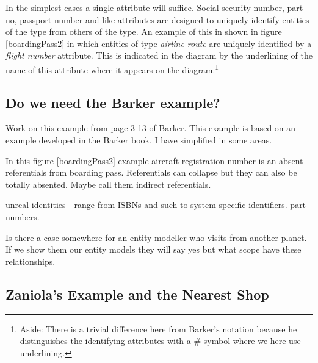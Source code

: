 \mynote In the simplest cases a single attribute will suffice. Social security number, part no, 
passport number and like attributes are designed to uniquely identify entities of the type from others of the type. 
An example of this 
in  shown in figure \ref{boardingPass2} in which entities of type \textit{airline route} are uniquely identified by a \textit{flight number} attribute.
This is
indicated in the diagram  by the underlining of the name of this attribute where it appears on the diagram.\footnote{Aside: There is a trivial difference here from Barker's notation because he distinguishes the identifying attributes with a \# symbol where we here use  underlining.} 

 
\subsection{Do we need the Barker example?}
\mynote Work on this example from page 3-13 of Barker.
{This example is based on an example developed in the Barker book. I have simplified in some areas.}


\begin{noteforfuture}
In this figure \ref{boardingPass2} example aircraft registration number is an absent referentials from
boarding pass. Referentials can collapse but they can also be totally absented. Maybe call them indirect referentials. 
\end{noteforfuture}



\begin{noteforfuture}
unreal identities - range from ISBNs and such to system-specific identifiers. part numbers.
\end{noteforfuture}
\begin{noteforfuture}
Is there a case somewhere for an entity modeller who visits from another planet.
If we show them our entity models they will say yes but what scope have these relationships.
\end{noteforfuture}

\subsection{Zaniola's Example and the Nearest Shop}



 
